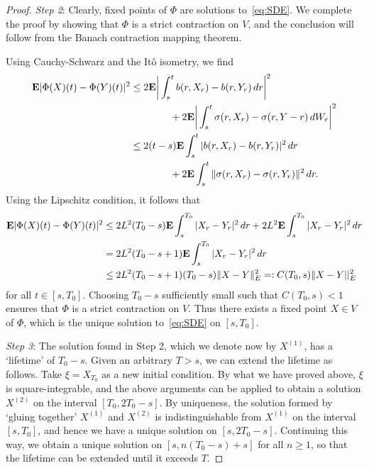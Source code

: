 \begin{proof}
	\emph{Step 2}: Clearly, fixed points of $\Phi$ are solutions to~\eqref{eq:SDE}. We complete the proof by showing that $\Phi$ is a strict contraction on $V$, and the conclusion will follow from the Banach contraction mapping theorem.
	
	Using Cauchy-Schwarz and the It\^{o} isometry, we find
	\begin{align*}
		\mathbf{E}|\Phi(X)(t)-\Phi(Y)(t)|^2 &\le 2\mathbf{E}\bigg|\int_s^t b(r,X_r)-b(r,Y_r)\,dr\bigg|^2 \\
		&\qquad\qquad + 2\mathbf{E}\bigg|\int_s^t \sigma(r,X_r)-\sigma(r,Y-r)\,dW_r\bigg|^2 \\
		&\le 2(t-s)\mathbf{E}\int_s^t|b(r,X_r)-b(r,Y_r)|^2\,dr \\
		&\qquad\qquad + 2\mathbf{E}\int_s^t \|\sigma(r,X_r)-\sigma(r,Y_r)\|^2\,dr.
	\end{align*}
	Using the Lipschitz condition, it follows that
	\begin{align*}
		\mathbf{E}|\Phi(X)(t)-\Phi(Y)(t)|^2 &\le 2L^2(T_0-s)\mathbf{E}\int_s^{T_0}|X_r-Y_r|^2\,dr + 2L^2\mathbf{E}\int_s^{T_0}|X_r-Y_r|^2\,dr \\
		&= 2L^2(T_0-s+1)\mathbf{E}\int_s^{T_0}|X_r-Y_r|^2\,dr \\
		&\le 2L^2(T_0-s+1)(T_0-s)\|X-Y\|^2_E =:C(T_0,s)\|X-Y||^2_E
	\end{align*}
	for all $t\in [s,T_0]$. Choosing $T_0-s$ sufficiently small such that $C(T_0,s)<1$ ensures that $\Phi$ is a strict contraction on $V$. Thus there exists a fixed point $X\in V$ of $\Phi$, which is the unique solution to~\eqref{eq:SDE} on $[s,T_0]$.
	
	\emph{Step 3}: The solution found in Step 2, which we denote now by $X^{(1)}$, has a `lifetime' of $T_0-s$. Given an arbitrary $T>s$, we can extend the lifetime as follows. Take $\xi=X_{T_0}$ as a new initial condition. By what we have proved above, $\xi$ is square-integrable, and the above arguments can be applied to obtain a solution $X^{(2)}$ on the interval $[T_0,2T_0-s]$. By uniqueness, the solution formed by `gluing together' $X^{(1)}$ and $X^{(2)}$ is indistinguishable from $X^{(1)}$ on the interval $[s,T_0]$, and hence we have a unique solution on $[s,2T_0-s]$. Continuing this way, we obtain a unique solution on $[s,n(T_0-s)+s]$ for all $n\ge 1$, so that the lifetime can be extended until it exceeds $T$.
\end{proof}